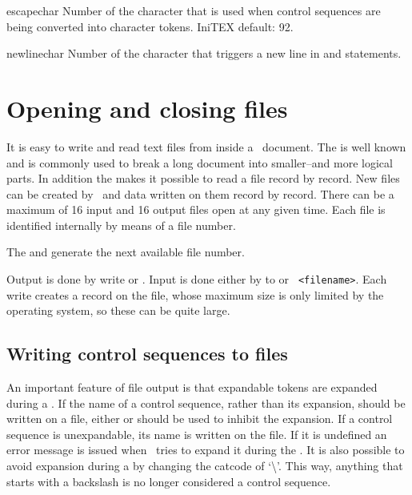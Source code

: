 \begin{docCommand*}{escapechar}{}
 Number of the character that is used when control sequences are being converted into character tokens. IniTEX default: 92.\\
\end{docCommand*}

\begin{docCommand*}{newlinechar}{}
 Number of the character that triggers a new line in  and 
statements.
\end{docCommand*}

\section{Opening and closing files}

It is easy to write and read text files from inside a \tex\  document. The \cmd{} is well known and is commonly used
to break a long document into smaller--and more logical parts. In addition the \cmd{\read} makes it  possible to
read a file record by record. New files can be created by \tex\ and data written on them record by record. There can be
a maximum of 16 input and 16 output files open at any given time. Each file is identified  internally by means of a file number. 


The \cmd{\newread} and \cmd{\newwrite} generate the next available file number. 



Output is done by write or \cmd{\immediate}\cmd{\write}. Input is done either by  to or 
\verb+ <filename>+. Each write creates a record on the file, whose maximum size is only limited by the operating system, so these can be quite large.

\subsection{Writing control sequences to files}

An important feature of file output is that expandable tokens are expanded during a . If the
name of a control sequence, rather than its expansion, should be written on a file, either
\cmd{\noexpand} or \cmd{\string} should be used to inhibit the expansion. If a control sequence is unexpandable,
its name is written on the file. If it is undefined an error message is issued when \tex\ tries to expand it during
the . It is also possible to avoid expansion during a  by changing the catcode of `\textbackslash'. This way, anything that starts with a backslash is no longer considered a control sequence.

